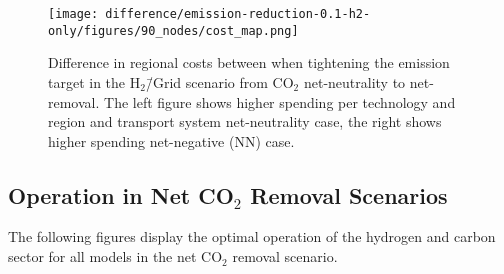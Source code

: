 \documentclass[twocolumn]{article}
\newcommand{\carbon}{CO$_2$}
\newcommand{\hydrogengrid}{H$_2$\=/Grid}
\newcommand{\hydrogenscenario}{H$_2$\=/Grid scenario}
\newcommand{\hybridscenario}{Hybrid scenario}
\begin{document}
\begin{figure}[ht!]
    \centering
    \texttt{[image: difference/emission-reduction-0.1-h2-only/figures/90\_nodes/cost\_map.png]}
    \caption{Difference in regional costs between when tightening the emission target in the \hydrogenscenario{} from \carbon{} net-neutrality to net-removal. The left figure shows higher spending per technology and region and transport system net-neutrality case, the right shows higher spending net-negative (NN) case.}
    \label{fig:cost_map_difference_h2_nn}
\end{figure}










\clearpage
\subsection{Operation in Net \carbon{} Removal Scenarios}
\label{sec:operation_nn}
The following figures display the optimal operation of the hydrogen and carbon sector for all models in the net \carbon{} removal scenario.
\end{document}
